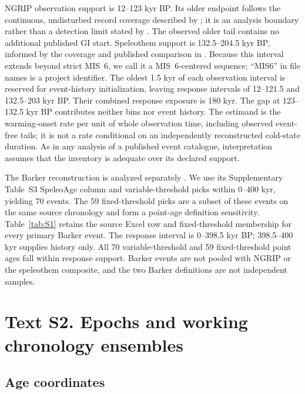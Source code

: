 \documentclass[11pt]{article}
\begin{document}
NGRIP observation support is 12--123 kyr BP. Its older endpoint follows the continuous, undisturbed record coverage described by \citet{ngrip2004high}; it is an analysis boundary rather than a detection limit stated by \citet{rasmussen2014stratigraphic}. The observed older tail contains no additional published GI start. Speleothem support is 132.5--204.5 kyr BP, informed by the coverage and published comparison in \citet{held2024dansgaard}. Because this interval extends beyond strict MIS~6, we call it a MIS~6-centered sequence; ``MIS6'' in file names is a project identifier. The oldest 1.5 kyr of each observation interval is reserved for event-history initialization, leaving response intervals of 12--121.5 and 132.5--203 kyr BP. Their combined response exposure is 180 kyr. The gap at 123--132.5 kyr BP contributes neither bins nor event history. The estimand is the warming-onset rate per unit of whole observation time, including observed event-free tails; it is not a rate conditional on an independently reconstructed cold-state duration. As in any analysis of a published event catalogue, interpretation assumes that the inventory is adequate over its declared support.

The Barker reconstruction is analyzed separately \citep{barker2011800}. We use its Supplementary Table~S3 SpeleoAge column and variable-threshold picks within 0--400 kyr, yielding 70 events. The 59 fixed-threshold picks are a subset of these events on the same source chronology and form a point-age definition sensitivity. Table~\ref{tab:S1} retains the source Excel row and fixed-threshold membership for every primary Barker event. The response interval is 0--398.5 kyr BP; 398.5--400 kyr supplies history only. All 70 variable-threshold and 59 fixed-threshold point ages fall within response support. Barker events are not pooled with NGRIP or the speleothem composite, and the two Barker definitions are not independent samples.

\section*{Text S2. Epochs and working chronology ensembles}

\subsection*{Age coordinates}
\end{document}
